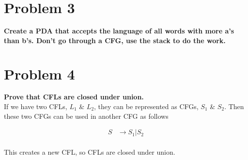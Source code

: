 \documentclass[12pt]{scrbook}
\begin{document}
\section*{Problem 3} \textbf{Create a PDA that accepts the language of all
  words with more a's than b's. Don't go through a CFG, use the stack to do the
  work.}

  \begin{figure}[H]
  \end{figure}


\newpage
\section*{Problem 4} \textbf{Prove that CFLs are closed under union.}\\
If we have two CFLs, $L_1$ & $L_2$, they can be represented as CFGs,
$S_1$ & $S_2$.  Then these two CFGs can be used in another CFG as follows

  \begin{align*}
    S &\rightarrow S_1 | S_2 \\
  \end{align*}

This creates a new CFL, so CFLs are closed under union.
\end{document}
